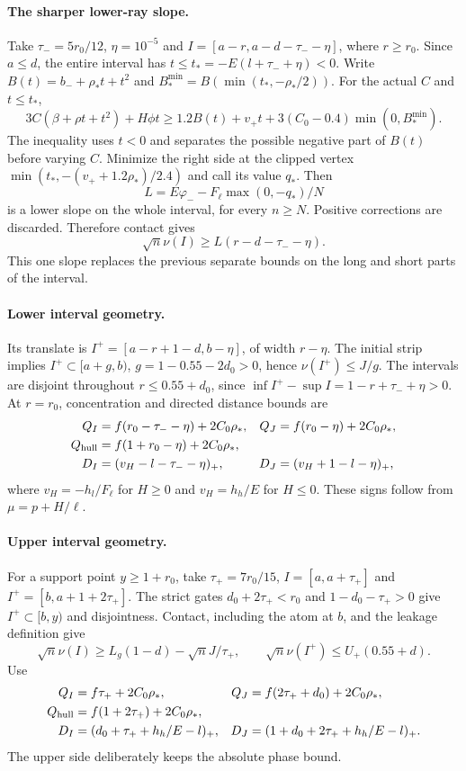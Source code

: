 \paragraph{The sharper lower-ray slope.}
Take $\tau_-=5r_0/12$, $\eta=10^{-5}$ and
$I=[a-r,a-d-\tau_--\eta]$, where $r\ge r_0$.
Since $a\le d$, the entire interval has
$t\le t_*=-E(l+\tau_-+\eta)<0$.
Write $B(t)=b_-+\rho_*t+t^2$ and
$B_*^{\min}=B(\min(t_*,-\rho_*/2))$. For the actual $C$ and $t\le t_*$,
\[
 3C(\beta+\rho t+t^2)+H\phi t
 \ge1.2B(t)+v_+t+3(C_0-0.4)\min(0,B_*^{\min}).
\]
The inequality uses $t<0$ and separates the possible negative part of
$B(t)$ before varying $C$. Minimize the right side at the clipped vertex
$\min(t_*,-(v_++1.2\rho_*)/2.4)$ and call its value $q_*$. Then
\[
 L=E\varphi_--F_\ell\max(0,-q_*)/N
\]
is a lower slope on the whole interval, for every $n\ge N$.
Positive corrections are discarded. Therefore contact gives
\[
 \sqrt n\nu(I)\ge L(r-d-\tau_--\eta).
\]
This one slope replaces the previous separate bounds on the long and
short parts of the interval.

\paragraph{Lower interval geometry.}
Its translate is $I^+=[a-r+1-d,b-\eta]$, of width $r-\eta$.
The initial strip implies $I^+\subset[a+g,b)$,
$g=1-0.55-2d_0>0$, hence $\nu(I^+)\le J/g$.
The intervals are disjoint throughout $r\le0.55+d_0$, since
$\inf I^+-\sup I=1-r+\tau_-+\eta>0$.
At $r=r_0$, concentration and directed distance bounds are
\begin{align*}
 Q_I&=f(r_0-\tau_--\eta)+2C_0\rho_*,&
 Q_J&=f(r_0-\eta)+2C_0\rho_*,\\
 Q_{\rm hull}&=f(1+r_0-\eta)+2C_0\rho_*,\\
 D_I&=(v_H-l-\tau_--\eta)_+,&
 D_J&=(v_H+1-l-\eta)_+,
\end{align*}
where $v_H=-h_l/F_\ell$ for $H\ge0$ and $v_H=h_h/E$ for $H\le0$.
These signs follow from $\mu=p+H/\ell$.

\paragraph{Upper interval geometry.}
For a support point $y\ge1+r_0$, take $\tau_+=7r_0/15$,
$I=[a,a+\tau_+]$ and $I^+=[b,a+1+2\tau_+]$.
The strict gates $d_0+2\tau_+<r_0$ and $1-d_0-\tau_+>0$ give
$I^+\subset[b,y)$ and disjointness. Contact, including the atom at $b$,
and the leakage definition give
\[
 \sqrt n\nu(I)\ge L_g(1-d)-\sqrt nJ/\tau_+,\qquad
 \sqrt n\nu(I^+)\le U_+(0.55+d).
\]
Use
\begin{align*}
 Q_I&=f\tau_++2C_0\rho_*,&Q_J&=f(2\tau_++d_0)+2C_0\rho_*,\\
 Q_{\rm hull}&=f(1+2\tau_+)+2C_0\rho_*,\\
 D_I&=(d_0+\tau_++h_h/E-l)_+,&
 D_J&=(1+d_0+2\tau_++h_h/E-l)_+.
\end{align*}
The upper side deliberately keeps the absolute phase bound.

